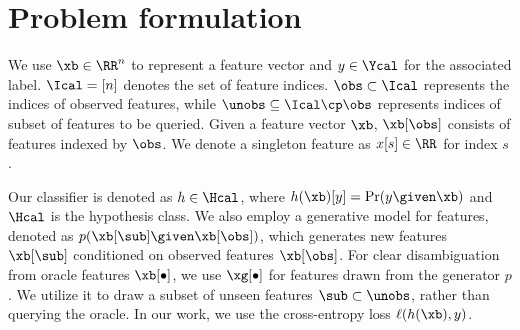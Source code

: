 \documentclass[letterpaper]{article}
\begin{document}
\section{Problem formulation}

We use $\xb\in \RR^n$ to represent a feature vector and $y\in \Ycal$ for the associated label. $\Ical = [n]$ denotes the set of feature indices. $\obs \subset \Ical$ represents the indices of observed features, while $\unobs \subseteq \Ical\cp \obs$ represents indices of subset of features to be queried. Given a feature vector $\xb$, $\xb[\obs]$ consists of features indexed by $\obs$. We denote a singleton feature as $x[s] \in \RR$ for index $s$.

Our classifier is denoted as $h \in \Hcal$, where $h(\xb)[y] = \Pr(y \given \xb)$ and $\Hcal$ is the hypothesis class. We also employ a generative model for features, denoted as $p(\xb[\sub] \given \xb[\obs])$, which generates new features $\xb[\sub]$ conditioned on observed features $\xb[\obs]$. For clear disambiguation from oracle features $\xb[\bullet]$, we use $\xg[\bullet]$ for features drawn from the generator $p$. We utilize it to draw a subset of unseen features $\sub \subset \unobs$, rather than querying the oracle.
In our work, we use the cross-entropy loss $\ell(h(\xb),y)$. 
\end{document}
